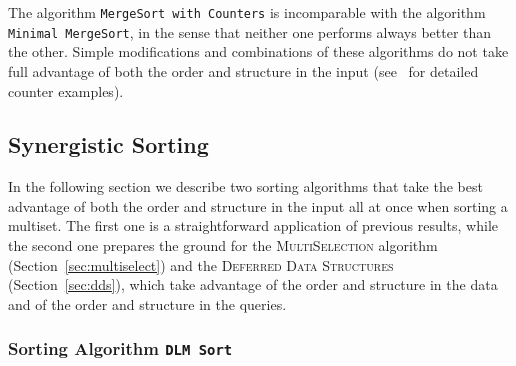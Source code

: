 The algorithm \texttt{MergeSort with Counters} is incomparable with
the algorithm \texttt{Minimal MergeSort}, in the sense that neither
one performs always better than the other. Simple modifications and
combinations of these algorithms do not take full advantage of both
the order and structure in the input
(see~\cite{2016-ARXIV-SynergisticSortingAndDeferredDataStructuresOnMultiSets-BarbayOchoaSatty}
for detailed counter examples).

\subsection{Synergistic Sorting}
\label{sec:syn-sort}

In the following section we describe two sorting algorithms that take
the best advantage of both the order and structure
in the input all at once when sorting a multiset. The first one is a
straightforward application of previous results, while the second one
prepares the ground for the \textsc{MultiSelection} algorithm
(Section~\ref{sec:multiselect}) and the \textsc{Deferred Data
  Structures} (Section~\ref{sec:dds}), which take
advantage of the order and structure in the data
and of the order and structure in the queries.

\subsubsection{Sorting Algorithm \texttt{DLM
    Sort}}
\label{sec:dlm-sort}

